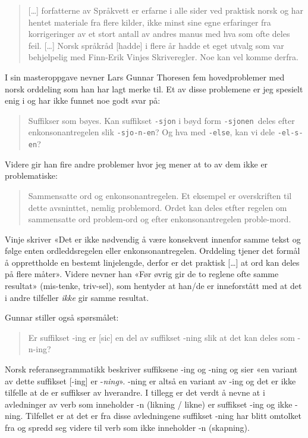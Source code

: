 \begin{quote}
[…] forfatterne av Språkvett er erfarne i alle sider ved praktisk norsk og har hentet materiale fra flere kilder, ikke minst sine egne erfaringer fra korrigeringer av et stort antall av andres manus med hva som ofte deles feil.
[…] Norsk språkråd [hadde] i flere år hadde et eget utvalg som var behjelpelig med Finn-Erik Vinjes Skriveregler. Noe kan vel komme derfra.
\end{quote}

I sin masteroppgave\cite{thoresen1993virtuelle} nevner Lars Gunnar Thoresen fem hovedproblemer med norsk orddeling som han har lagt merke til. Et av disse problemene er jeg spesielt enig i og har ikke funnet noe godt svar på:

\begin{quote}
	Suffikser som bøyes. Kan suffikset \texttt{-sjon} i bøyd form \texttt{-sjonen }deles efter enkonsonantregelen slik \texttt{-sjo-n-en}? Og hva med \texttt{-else}, kan vi dele \texttt{-el-s-en}?
\end{quote}

Videre gir han fire andre problemer hvor jeg mener at to av dem ikke er problematiske:

\begin{quote}
	Sammensatte ord og enkonsonantregelen. Et eksempel er overskriften til dette avsninttet, nemlig problemord. Ordet kan deles etfter regelen om sammensatte ord problem-ord og efter enkonsonantregelen proble-mord.
\end{quote}

Vinje\cite{vinje} skriver «Det er ikke nødvendig å være konsekvent innenfor samme tekst og følge enten ordleddsregelen eller enkonsonantregelen. Orddeling tjener det formål å opprettholde en bestemt linjelengde, derfor er det praktisk […] at ord kan deles på flere måter». Videre nevner han «Før øvrig gir de to reglene ofte samme resultat» (mis-tenke, triv-sel), som hentyder at han/de er inneforstått med at det i andre tilfeller \textit{ikke} gir samme resultat.

Gunnar stiller også spørsmålet:

\begin{quote}
	Er suffikset -ing er [sic] en del av suffikset -ning slik at det kan deles som -n-ing?
\end{quote}

Norsk referansegrammatikk\cite[s.~97--98]{faarlund1997norsk} beskriver suffiksene -ing og -ning og sier «en variant av dette suffikset [-ing] er -\textit{ning}». -ning er altså en variant av -ing og det er ikke tilfelle at de er suffikser av hverandre. I tillegg er det verdt å nevne at i avledninger av verb som inneholder -n (likning / likne) er suffikset -ing og ikke -ning. Tilfellet er at det er fra disse avledningene suffikset -ning har blitt omtolket fra og spredd seg videre til verb som ikke inneholder -n (skapning). \cite[s.~98]{faarlund1997norsk}